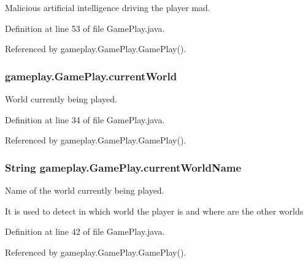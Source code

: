 Malicious artificial intelligence driving the player mad. 



Definition at line 53 of file Game\-Play.\-java.



Referenced by gameplay.\-Game\-Play.\-Game\-Play().

\hypertarget{classgameplay_1_1_game_play_acac96730473a405274e9ff0a58e4d77e}{
\subsubsection[{current\-World}]{ gameplay.\-Game\-Play.\-current\-World\hspace{0.3cm}{\ttfamily [protected]}}}\label{classgameplay_1_1_game_play_acac96730473a405274e9ff0a58e4d77e}


World currently being played. 



Definition at line 34 of file Game\-Play.\-java.



Referenced by gameplay.\-Game\-Play.\-Game\-Play().

\hypertarget{classgameplay_1_1_game_play_adcc37bdd0470d8adc27fa249d93adcff}{
\subsubsection[{current\-World\-Name}]{\setlength{\rightskip}{0pt plus 5cm}String gameplay.\-Game\-Play.\-current\-World\-Name\hspace{0.3cm}{\ttfamily [protected]}}}\label{classgameplay_1_1_game_play_adcc37bdd0470d8adc27fa249d93adcff}


Name of the world currently being played. 

It is used to detect in which world the player is and where are the other worlds 

Definition at line 42 of file Game\-Play.\-java.



Referenced by gameplay.\-Game\-Play.\-Game\-Play().

